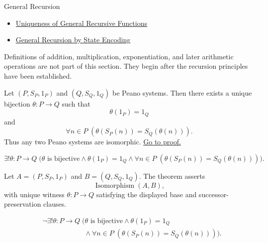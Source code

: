 \begin{topicbox}{General Recursion}
\begin{remark*}[Dependencies]
\begin{itemize}
  \item \hyperref[lem:uniqueness-of-general-recursive-functions]{Uniqueness of General Recursive Functions}
  \item \hyperref[thm:general-recursion-by-state-encoding]{General Recursion by State Encoding}
\end{itemize}
\end{remark*}

\begin{remark*}
Definitions of addition, multiplication, exponentiation, and later arithmetic
operations are not part of this section. They begin after the recursion
principles have been established.
\end{remark*}

\begin{tcolorbox}[colback=thmbox, colframe=thmborder, arc=2pt,
  left=6pt, right=6pt, top=4pt, bottom=4pt,
  title={\small\textbf{Theorem (Uniqueness of Peano Systems up to Isomorphism)}},
  fonttitle=\small\bfseries]
\begin{theorem}
\label{thm:uniqueness-of-peano-systems-up-to-isomorphism}
Let $(P,S_P,1_P)$ and $(Q,S_Q,1_Q)$ be Peano systems. Then there exists a
unique bijection $\theta:P\to Q$ such that
\[
\theta(1_P)=1_Q
\]
and
\[
\forall n\in P\;(\theta(S_P(n))=S_Q(\theta(n))).
\]
Thus any two Peano systems are isomorphic.
\hyperref[prf:uniqueness-of-peano-systems-up-to-isomorphism]{Go to proof.}
\end{theorem}
\end{tcolorbox}

\begin{remark*}
\[
\exists! \theta:P\to Q\;
\bigl(\theta \text{ is bijective}\land \theta(1_P)=1_Q
\land \forall n\in P\;(\theta(S_P(n))=S_Q(\theta(n)))\bigr).
\]
\end{remark*}

\begin{remark*}
Let $A=(P,S_P,1_P)$ and $B=(Q,S_Q,1_Q)$. The theorem asserts
\[
\operatorname{Isomorphism}(A,B),
\]
with unique witness $\theta:P\to Q$ satisfying the displayed base and
successor-preservation clauses.
\end{remark*}

\begin{remark*}
\[
\begin{aligned}
&\neg\exists! \theta:P\to Q\;
\bigl(\theta \text{ is bijective}\land \theta(1_P)=1_Q\\
&\qquad\qquad\qquad\land
\forall n\in P\;(\theta(S_P(n))=S_Q(\theta(n)))\bigr).
\end{aligned}
\]
\end{remark*}


\end{topicbox}
